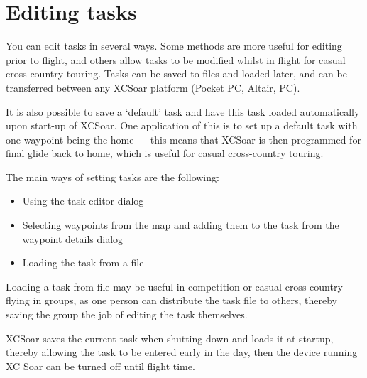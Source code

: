 \section{Editing tasks}

You can edit tasks in several ways.  Some methods are more useful for
editing prior to flight, and others allow tasks to be modified whilst
in flight for casual cross-country touring.  Tasks can be saved to
files and loaded later, and can be transferred between any XCSoar
platform (Pocket PC, Altair, PC).

\tip It is also possible to save a `default' task and have this task loaded
automatically upon start-up of XCSoar.  One application of this is to
set up a default task with one waypoint being the home --- this means
that XCSoar is then programmed for final glide back to home, which is
useful for casual cross-country touring.

The main ways of setting tasks are the following:
\begin{itemize}
\item Using the task editor dialog
\item Selecting waypoints from the map and adding them to the task from the
 waypoint details dialog
\item Loading the task from a file
\end{itemize}

%

\tip Loading a task from file may be useful in competition or casual
cross-country flying in groups, as one person can distribute the task
file to others, thereby saving the group the job of editing the task
themselves.


XCSoar saves the current task when shutting down and loads it at
startup, thereby allowing the task to be entered early in the day,
then the device running XC Soar can be turned off until flight time.

